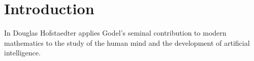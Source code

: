 \section{Introduction}
In Douglas Hofstaedter applies Godel's seminal contribution to modern
mathematics to the study of the human mind and the development of artificial
intelligence.
